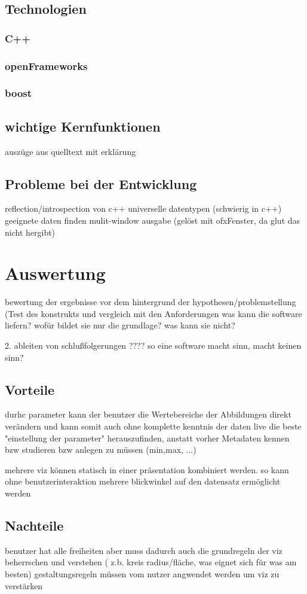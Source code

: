 \documentclass[a4paper, 12pt, onepage, pdftex, headsepline, footsepline]{scrreprt}
\begin{document}
\section{Technologien}
\subsection{C++}
\subsection{openFrameworks}
\subsection{boost}
\section{wichtige Kernfunktionen}
auszüge aus quelltext mit erklärung
\section{Probleme bei der Entwicklung}
reflection/introspection von c++
universelle datentypen (schwierig in c++)
geeignete daten finden
mulit-window ausgabe (gelöst mit ofxFenster, da glut das nicht hergibt)
\chapter{Auswertung}
bewertung der ergebnisse vor dem hintergrund der hypothesen/problemstellung (Test des konstrukts und vergleich mit den Anforderungen
was kann die software liefern? wofür bildet sie nur die grundlage? was kann sie nicht?

2. ableiten von schlußfolgerungen
????
so eine software macht sinn, macht keinen sinn?
\section{Vorteile}
durhc parameter kann der benutzer die Wertebereiche der Abbildungen direkt verändern und kann somit auch ohne komplette kenntnis der daten live die beste "einstellung der parameter" herauszufinden, anstatt vorher Metadaten kennen bzw studieren bzw anlegen zu müssen (min,max, ...)

mehrere viz können statisch in einer präsentation kombiniert werden. so kann ohne benutzerinteraktion mehrere blickwinkel auf den datensatz ermöglicht werden

\section{Nachteile}
benutzer hat alle freiheiten aber muss dadurch auch die grundregeln der viz beherrschen und verstehen ( z.b. kreis radius/fläche, was eignet sich für was am besten)
gestaltungsregeln müssen vom nutzer angwendet werden um viz zu verstärken
\end{document}
